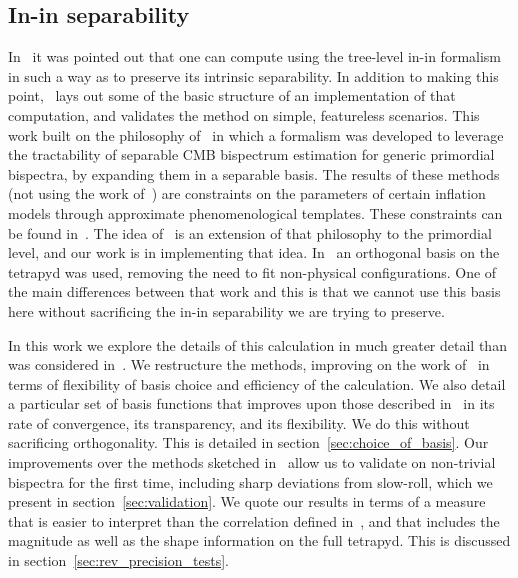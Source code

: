 \documentclass[a4paper,12pt]{extarticle}
\begin{document}
\subsection{In-in separability}\label{sec:rev_funakoshi}
In~\cite{Funakoshi} it was pointed out that one can compute using the
tree-level in-in formalism in such a way as to preserve its intrinsic
separability. In addition to making this point,~\cite{Funakoshi} lays
out some of the basic structure of an implementation of that computation,
and validates the method on simple, featureless scenarios.
This work built on the philosophy of~\cite{FergShell_1,FergShell_2,FergShell_3}
in which a formalism was developed to
leverage the tractability of separable CMB bispectrum estimation
for generic primordial bispectra, by expanding them in a separable basis.
The results of these methods (not using the work of~\cite{Funakoshi})
are constraints on the parameters of certain inflation models through approximate
phenomenological templates.
These constraints can be found in~\cite{Planck_NG_2015, Planck_NG_2018}.
The idea of~\cite{Funakoshi} is an extension of that philosophy to the primordial level,
and our work is in implementing that idea.
In~\cite{FergShell_1,FergShell_2,FergShell_3} an orthogonal basis on the tetrapyd was used,
removing the need to fit non-physical configurations.
One of the main differences between that work and this
is that we cannot use this basis here without sacrificing the
in-in separability we are trying to preserve.

In this work we explore the details of this calculation in much greater detail
than was considered in~\cite{Funakoshi}.
We restructure the methods, improving on the work of~\cite{Funakoshi} in terms
of flexibility of basis choice and efficiency of the calculation.
We also detail a particular set of basis functions that improves upon those described
in~\cite{Funakoshi} in its rate of convergence, its transparency,
and its flexibility.
We do this without sacrificing orthogonality.
This is detailed in section~\ref{sec:choice_of_basis}.
Our improvements over the methods sketched in~\cite{Funakoshi} allow us to validate
on non-trivial bispectra for the first time, including sharp deviations from slow-roll, which we present in
section~\ref{sec:validation}.
We quote our results in terms of a measure that is
easier to interpret than the correlation defined in~\cite{Funakoshi},
and that includes the magnitude as well as the shape information
on the full tetrapyd.
This is discussed in section~\ref{sec:rev_precision_tests}.
\end{document}

